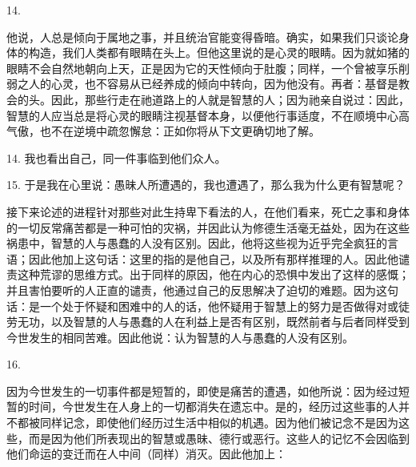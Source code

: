 14. \par

他说，人总是倾向于属地之事，并且统治官能变得昏暗。确实，如果我们只谈论身体的构造，我们人类都有眼睛在头上。但他这里说的是心灵的眼睛。因为就如猪的眼睛不会自然地朝向上天，正是因为它的天性倾向于肚腹；同样，一个曾被享乐削弱之人的心灵，也不容易从已经养成的倾向中转向，因为他没有。再者：基督是教会的头。因此，那些行走在祂道路上的人就是智慧的人；因为祂亲自说过：因此，智慧的人应当总是将心灵的眼睛注视基督本身，以便他行事适度，不在顺境中心高气傲，也不在逆境中疏忽懈怠：正如你将从下文更确切地了解。\par

14. 我也看出自己，同一件事临到他们众人。\par

15. 于是我在心里说：愚昧人所遭遇的，我也遭遇了，那么我为什么更有智慧呢？\par

接下来论述的进程针对那些对此生持卑下看法的人，在他们看来，死亡之事和身体的一切反常痛苦都是一种可怕的灾祸，并因此认为修德生活毫无益处，因为在这些祸患中，智慧的人与愚蠢的人没有区别。因此，他将这些视为近乎完全疯狂的言语；因此他加上这句话：这里的指的是他自己，以及所有那样推理的人。因此他谴责这种荒谬的思维方式。出于同样的原因，他在内心的恐惧中发出了这样的感慨；并且害怕要听的人正直的谴责，他通过自己的反思解决了迫切的难题。因为这句话：是一个处于怀疑和困难中的人的话，他怀疑用于智慧上的努力是否做得对或徒劳无功，以及智慧的人与愚蠢的人在利益上是否有区别，既然前者与后者同样受到今世发生的相同苦难。因此他说：认为智慧的人与愚蠢的人没有区别。\par

16. \par

因为今世发生的一切事件都是短暂的，即使是痛苦的遭遇，如他所说：因为经过短暂的时间，今世发生在人身上的一切都消失在遗忘中。是的，经历过这些事的人并不都被同样记念，即使他们经历过生活中相似的机遇。因为他们被记念不是因为这些，而是因为他们所表现出的智慧或愚昧、德行或恶行。这些人的记忆不会因临到他们命运的变迁而在人中间（同样）消灭。因此他加上：\par

